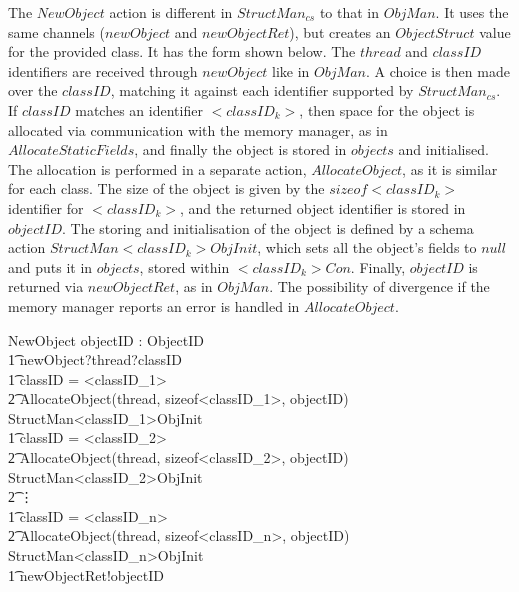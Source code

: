 The $NewObject$ action is different in $StructMan_{cs}$ to that in
$ObjMan$. 
It uses the same channels ($newObject$ and $newObjectRet$), but
creates an $ObjectStruct$ value for the provided class.
It has the form shown below.
The $thread$ and $classID$ identifiers are received through
$newObject$ like in $ObjMan$.
A choice is then made over the $classID$, matching it against each
identifier supported by $StructMan_{cs}$.
If $classID$ matches an identifier ${<}classID_k{>}$, then space for
the object is allocated via communication with the memory manager, as
in $AllocateStaticFields$, and finally the object is stored in
$objects$ and initialised.
The allocation is performed in a separate action, $AllocateObject$, as
it is similar for each class.
The size of the object is given by the $sizeof{<}classID_k{>}$
identifier for ${<}classID_k{>}$, and the returned object identifier
is stored in $objectID$.
The storing and initialisation of the object is defined by a schema
action $StructMan{<}classID_k{>}ObjInit$, which sets all the object's
fields to $null$ and puts it in $objects$, stored within
${<}classID_k{>}Con$. 
Finally, $objectID$ is returned via $newObjectRet$, as in $ObjMan$.
The possibility of divergence if the memory manager reports an error
is handled in $AllocateObject$.
\begin{circusaction}
  NewObject \circdef \circvar objectID : ObjectID \circspot \\
  \t1 newObject?thread?classID \then \\
  \t1 \circif classID = {{<}classID_1{>}} \circthen {} \\
  \t2 AllocateObject(thread, sizeof{<}classID_1{>}, objectID) \circseq \lschexpract StructMan{<}classID_1{>}ObjInit \rschexpract \\
  \t1 {} \circelse classID = {{<}classID_2{>}} \circthen {} \\
  \t2 AllocateObject(thread, sizeof{<}classID_2{>}, objectID) \circseq \lschexpract StructMan{<}classID_2{>}ObjInit \rschexpract \\
  \t2 \vdots \\
  \t1 {} \circelse classID = {{<}classID_n{>}} \circthen {} \\
  \t2 AllocateObject(thread, sizeof{<}classID_n{>}, objectID) \circseq \lschexpract StructMan{<}classID_n{>}ObjInit \rschexpract \\
  \t1 \circfi \circseq newObjectRet!objectID \then \Skip \\
\end{circusaction}

